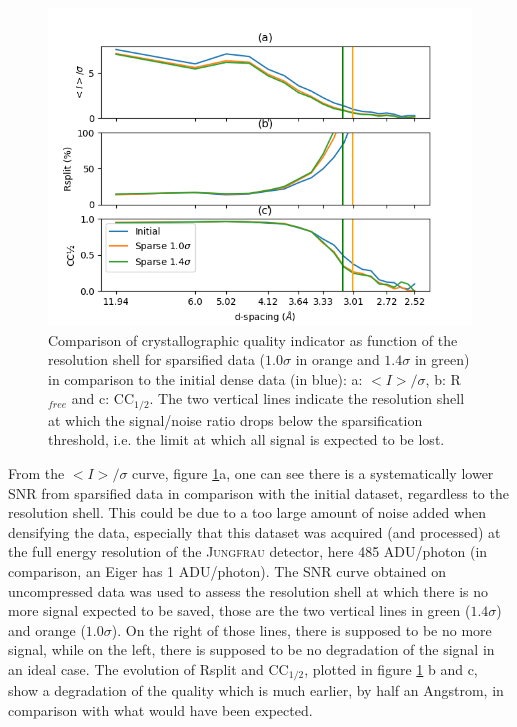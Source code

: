 \documentclass[preprint]{iucr}              %
\begin{document}
\begin{figure}
\label{f-NQO1}
\includegraphics[width=12cm]{NQO1/NQO1}
\caption{Comparison of crystallographic quality indicator as function of the resolution shell for sparsified data ($1.0\sigma$ in orange and $1.4\sigma$ in green) in comparison to the initial dense data (in blue):
a: $<I>/\sigma$, b: R$_{free}$ and c: CC$_{1/2}$.
The two vertical lines indicate the resolution shell at which the signal/noise ratio drops below the sparsification threshold, i.e. the limit at which all signal is expected to be lost.}

\end{figure}

From the $<I>/\sigma$ curve, figure \ref{f-NQO1}a, one can see there is a systematically lower SNR from sparsified data in comparison with the initial dataset, regardless to the resolution shell. 
This could be due to a too large amount of noise added when densifying the data, especially that this dataset was acquired (and processed) at the full energy resolution of the \textsc{Jungfrau} detector, here 485 ADU/photon (in comparison, an Eiger has 1 ADU/photon).
The SNR curve obtained on uncompressed data was used to assess the resolution shell at which there is no more signal expected to be saved, those are the two vertical lines in green ($1.4\sigma$) and 
orange ($1.0\sigma$). 
On the right of those lines, there is supposed to be no more signal, while on the left, there is supposed to be no degradation of the signal in an ideal case.
The evolution of Rsplit and CC$_{1/2}$, plotted in figure \ref{f-NQO1} b and c, show a degradation 
of the quality which is much earlier, by half an Angstrom, in comparison with what would have been expected. 
\end{document}
